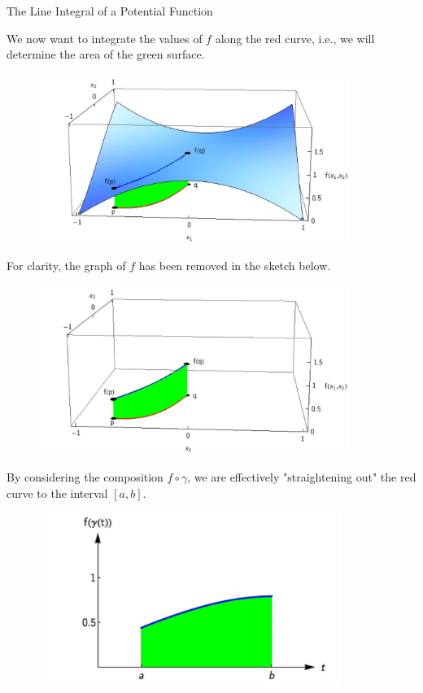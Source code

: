\documentclass[smaller,hyperref={CJKbookmarks=true}]{beamer}
\begin{document}
\begin{frame}{The Line Integral of a Potential Function}
\begin{spacing}{1}
\begin{figure}
\end{figure}
\newpage
We now want to integrate the values of $f$ along the red curve, i.e., we will determine the area of the green surface.
\begin{figure}
  \centering
  \includegraphics[width=0.9\textwidth]{57.jpg}

\end{figure}
\newpage
For clarity, the graph of $f$ has been removed in the sketch below.
\begin{figure}
  \centering
  \includegraphics[width=0.9\textwidth]{58.jpg}

\end{figure}
By considering the composition $f\circ\gamma$, we are ef{}fectively "straightening out" the red curve to the interval $[a,b]$.
\begin{figure}
  \centering
  \includegraphics[width=0.9\textwidth,height=160pt]{59.jpg}


\end{figure}
\end{spacing}
\end{frame}
\end{document}
